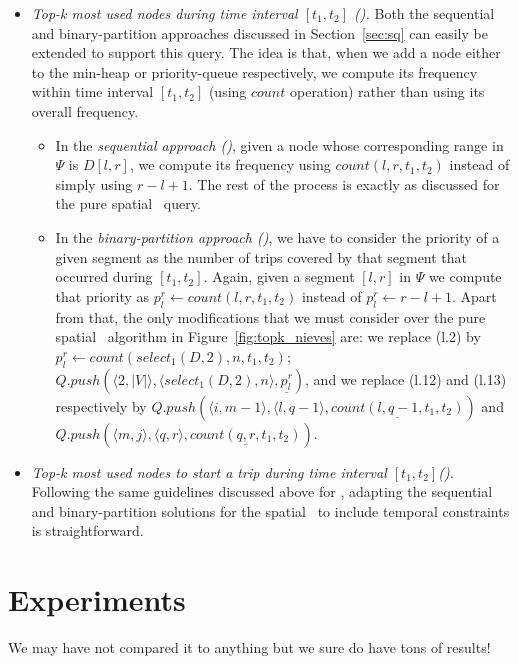 \begin{itemize}[leftmargin=3mm]
		


	\item {\em Top-k most used nodes during  time interval $[t_1,t_2]$ (\STtk).}
	Both the sequential and binary-partition approaches discussed in Section~\ref{sec:sq} can easily
	be extended to support this query. The idea is that, when we add a node either to the min-heap or priority-queue
	respectively, we compute its frequency within time interval $[t_1,t_2]$ (using $count$ operation) 
	rather than using its overall frequency.

	\begin{itemize}
		\item In the {\em sequential approach (\Stkseq)}, given a node whose corresponding range
		in $\Psi$ is $D[l,r]$, we compute its frequency using $count(l,r,t_1,t_2)$ instead of simply using  $r-l+1$. 
		The rest of the process is exactly as discussed for the pure spatial \Stkseq\ query.
		
		\item In the {\em binary-partition approach (\Stkbin)}, we have to consider the priority of a
		given segment as the number of trips covered by that segment that occurred during $[t_1,t_2]$. Again, given
		a segment $[l,r]$ in $\Psi$ we compute that priority as $p_l^r \leftarrow count(l,r,t_1,t_2)$ instead of 
		$p_l^r \leftarrow  r-l+1$. Apart from
		that, the only modifications that we must consider over the pure spatial \Stkbin\ algorithm in 
		Figure~\ref{fig:topk_nieves} are:
		we replace (l.2) by $p_l^r \leftarrow count(select_1(D,2),n,t_1,t_2)$; $Q.push(\langle2, |V|\rangle, \langle select_1(D,2), n\rangle, \underline{p_l^r})$,
		and we replace  (l.12) and (l.13) respectively by 
		   $ Q.push(\langle i, m-1 \rangle, \langle l, q-1 \rangle, \underline{count(l,q-1,t_1,t_2)})$ and
		   $ Q.push(\langle m,   j \rangle, \langle q,   r \rangle, \underline{count(q,r,t_1,t_2)})$.
		
	\end{itemize}


	\item {\em Top-k most used nodes to start a trip during time interval $[t_1,t_2]$(\STtks).}
	Following the same guidelines discussed above for \STtk, adapting the  sequential and 
	binary-partition solutions for the spatial \Stks\ to include temporal constraints is straightforward.	
		
		
	\end{itemize}


\section{Experiments}
	We may have not compared it to anything but we sure do have tons of results!

